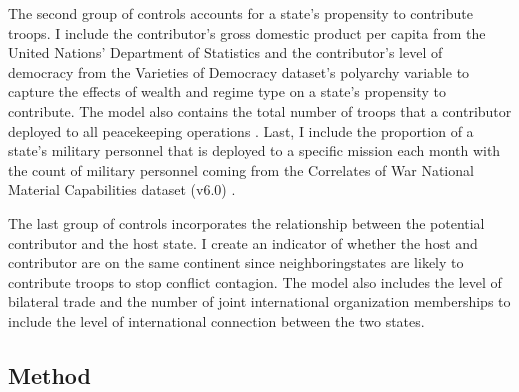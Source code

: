 \documentclass[12pt]{article}
\begin{document}

The second group of controls accounts for a state's propensity to contribute troops. I include the contributor's gross domestic product per capita from the United Nations' Department of Statistics \citep{UN_GDP} and the contributor's level of democracy from the Varieties of Democracy dataset's polyarchy variable \citep{VDemV11} to capture the effects of wealth and regime type on a state's propensity to contribute. The model also contains the total number of troops that a contributor deployed to all peacekeeping operations \citep{perry2013}. Last, I include the proportion of a state's military personnel that is deployed to a specific mission each month with the count of military personnel coming from the Correlates of War National Material Capabilities dataset (v6.0) \citep{CINC}. 

The last group of controls incorporates the relationship between the potential contributor and the host state. I create an indicator of whether the host and contributor are on the same continent since neighboring\footnotemark[14] states are likely to contribute troops to stop conflict contagion. The model also includes the level of bilateral trade \citep{barbieri2009trading} and the number of joint international organization memberships \citep{pevehouse2020tracking} to include the level of international connection between the two states. 


\subsection*{Method}
\end{document}
